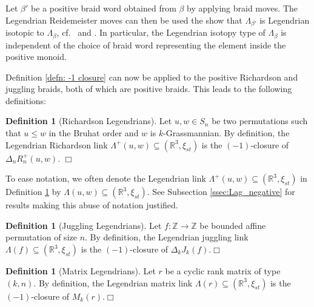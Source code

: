 \documentclass[10pt]{amsart}
\theoremstyle{plain}
\theoremstyle{definition}
\newtheorem{definition}[thm]{Definition}
\theoremstyle{remark}
\numberwithin{equation}{section}
\newcommand{\Z}{\mathbb{Z}}
\newcommand{\R}{\mathbb{R}}
\newcommand{\lr}{\longrightarrow}
\newcommand{\MG}[1]{{\color{teal}{{\bf Misha}: #1}}}
\begin{document}
\noindent Let $\beta'$ be a positive braid word obtained from $\beta$ by applying braid moves. The Legendrian Reidemeister moves can then be used the show that $\Lambda_{\beta'}$ is Legendrian isotopic to $\Lambda_\beta$, cf.~\cite[Section 2.3]{Etnyre05} and \cite{Kalman}. In particular, the Legendrian isotopy type of $\Lambda_\beta$ is independent of the choice of braid word representing the element inside the positive monoid.

Definition \ref{defn: -1 closure} can now be applied to the positive Richardson and juggling braids, both of which are positive braids. This leads to the following definitions:

\begin{definition}[Richardson Legendrians]\label{def:Richardson_Leg}
Let $u, w \in S_n$ be two permutations such that $u \leq w$ in the Bruhat order and $w$ is $k$-Grassmannian. By definition, the Legendrian Richardson link $\Lambda^+(u, w) \subseteq (\R^{3},\xi_{st})$ is the $(-1)$-closure of $\Delta_{n}R^{+}_{n}(u, w)$.%
\hfill$\Box$
\end{definition}

To ease notation, we often denote the Legendrian link $\Lambda^+(u, w) \subseteq (\R^{3},\xi_{st})$ in Definition \ref{def:Richardson_Leg} by $\Lambda(u, w) \subseteq (\R^{3},\xi_{st})$. See Subsection \ref{ssec:Lag_negative} for results making this abuse of notation justified.

\begin{definition}[Juggling Legendrians]\label{def:juggling_Leg}
Let $f:\Z\lr\Z$ be bounded affine permutation of size $n$. By definition, the Legendrian juggling link $\Lambda(f) \subseteq (\R^{3},\xi_{st})$ is the $(-1)$-closure of $\Delta_{k}J_k(f)$.\hfill$\Box$
\end{definition}

\begin{definition}[Matrix Legendrians]\label{def:matrix_Leg}
Let $r$ be a cyclic rank matrix of type $(k,n)$. By definition, the Legendrian matrix link $\Lambda(r) \subseteq (\R^{3},\xi_{st})$ is the $(-1)$-closure of $M_k(r)$.\hfill$\Box$
\end{definition}
\end{document}
